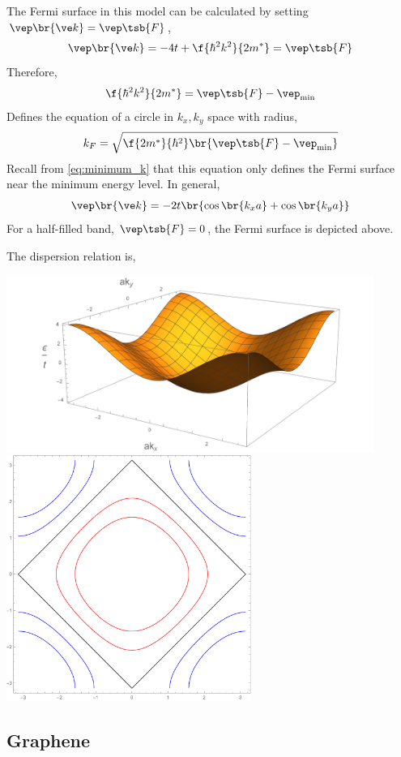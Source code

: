 \documentclass{article}
\begin{document}
The Fermi surface in this model can be calculated by setting $\vep \br{\ve k} = \vep\tsb{F}$,
\[ \vep\br{\ve k} = - 4t + \f{\hbar^2 k^2}{2 m^{*}} = \vep\tsb{F}\]
Therefore,
\[ \f{\hbar^2 k^2}{2 m^{*}} = \vep\tsb{F} - \vep_{\min} \]
Defines the equation of a circle in $k_x, k_y$ space with radius,
\[ k_{F} = \sqrt{\f{2m^{*}}{\hbar^2} \br{\vep\tsb{F} - \vep_{\min}}} \]
Recall from \cref{eq:minimum_k} that this equation only defines the Fermi surface near the minimum energy level. In general,
\[ \vep \br{\ve k} = - 2t \br{\cos \br{k_x a} + \cos \br{k_y a}} \]
For a half-filled band, $\vep\tsb{F} = 0$, the Fermi surface is depicted above.

The dispersion relation is,
\begin{center}
    \includegraphics[width=0.9\textwidth]{figures/square_3d_bz.pdf}
    \includegraphics[width=0.6\textwidth]{figures/square_3d_bz_fermi_surface.pdf}
\end{center}

\subsection{Graphene}
\end{document}
